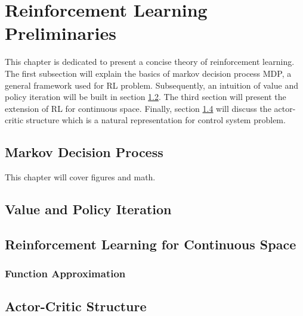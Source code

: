 \chapter{Reinforcement Learning Preliminaries}
This chapter is dedicated to present a concise theory of reinforcement learning. The first subsection will explain the basics of markov decision process \ac{MDP}, a general framework used for \ac{RL} problem. Subsequently, an intuition of value and policy iteration will be built in section \ref{sec:value_iter}. The third section will present the extension of  \ac{RL} for continuous space. Finally, section \ref{sec:actor} will discuss the actor-critic structure which is a natural representation for control system problem.

\section{Markov Decision Process}
This chapter will cover figures and math. 

\section{Value and Policy Iteration} \label{sec:value_iter}

\section{Reinforcement Learning for Continuous Space}
\subsection{Function Approximation}


\section{Actor-Critic Structure} \label{sec:actor}
